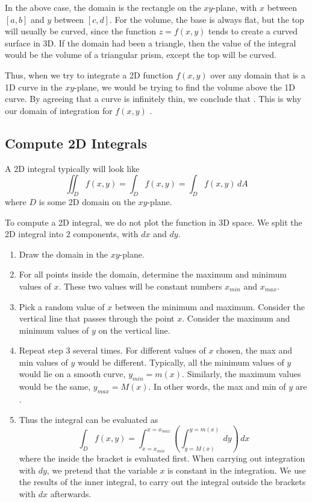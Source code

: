 \documentclass[11pt,fleqn]{book} %
\begin{document}
In the above case, the domain is the rectangle on the $xy$-plane, with $x$ between $[a, b]$ and $y$ between $[c, d]$. For the volume, the base is always flat, but the top will usually be curved, since the function $z = f(x, y)$ tends to create a curved surface in 3D. If the domain had been a triangle, then the value of the integral would be the volume of a triangular prism, except the top will be curved.

Thus, when we try to integrate a 2D function $f(x, y)$ over any domain that is a 1D curve in the $xy$-plane, we would be trying to find the volume above the 1D curve. By agreeing that a curve is infinitely thin, we conclude that . This is why our domain of integration for $f(x, y)$ .

\subsection*{Compute 2D Integrals}

A 2D integral typically will look like $$\iint_D f(x,y) = \int_D f(x, y) = \int_D f(x,y) \,dA$$ where $D$ is some 2D domain on the $xy$-plane.

To compute a 2D integral, we do not plot the function in 3D space. We split the 2D integral into 2 components, with $dx$ and $dy$.

\begin{enumerate}
    \item Draw the domain in the $xy$-plane.

    \item For all points inside the domain, determine the maximum and minimum values of $x$. These two values will be constant numbers $x_{min}$ and $x_{max}$.

    \item Pick a random value of $x$ between the minimum and maximum. Consider the vertical line that passes through the point $x$. Consider the maximum and minimum values of $y$ on the vertical line.

    \item Repeat step 3 several times. For different values of $x$ chosen, the max and min values of $y$ would be different. Typically, all the minimum values of $y$ would lie on a smooth curve, $y_{min} = m(x)$. Similarly, the maximum values would be the same, $y_{max} = M(x)$. In other words, the max and min of $y$ are .

    \item Thus the integral can be evaluated as $$\int_D f(x, y) = \int_{x=x_{min}}^{x=x_{max}} \left( \int_{y=M(x)}^{y=m(x)} \,dy \right) \,dx$$ where the  inside the bracket is evaluated first. When carrying out integration with $dy$, we pretend that the variable $x$ is constant in the integration. We use the results of the inner integral, to carry out the integral outside the brackets with $dx$ afterwards.
\end{enumerate}
\end{document}
